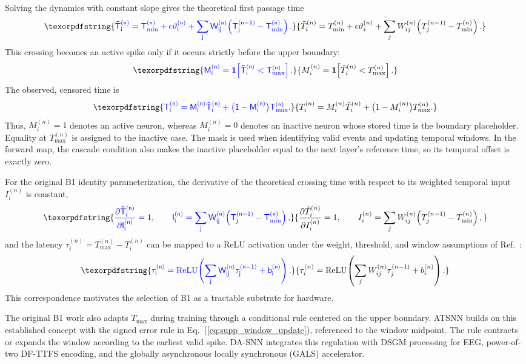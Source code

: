 \documentclass[12pt]{article}
\providecommand{\DIFaddtex}[1]{{\protect\color{blue}\sf #1}}
\providecommand{\DIFadd}[1]{\texorpdfstring{\DIFaddtex{#1}}{#1}}
\providecommand{\DIFaddend}{}
\begin{document}
\DIFadd{Solving the dynamics with constant slope gives the theoretical first passage time
}\begin{equation}
\DIFadd{\tilde{T}_i^{(n)} = T_{\min}^{(n)} + \epsilon\vartheta_i^{(n)} + \sum_j W_{ij}^{(n)}\!\left(T_j^{(n-1)} - T_{\min}^{(n)}\right).
\label{eq:supp_theoretical_time}
}\end{equation}
\DIFadd{This crossing becomes an active spike only if it occurs strictly before the upper boundary:
}\begin{equation}
\DIFadd{M_i^{(n)} = \mathbf{1}\!\left[\tilde{T}_i^{(n)} < T_{\max}^{(n)}\right].
\label{eq:b1_mask}
}\end{equation}
\DIFadd{The observed, censored time is
}\begin{equation}
\DIFadd{T_i^{(n)} = M_i^{(n)}\tilde{T}_i^{(n)} + \bigl(1-M_i^{(n)}\bigr)T_{\max}^{(n)}.
\label{eq:supp_actual_time}
}\end{equation}
\DIFadd{Thus, $M_i^{(n)}=1$ denotes an active neuron, whereas $M_i^{(n)}=0$ denotes an inactive neuron whose stored time is the boundary placeholder. Equality at $T_{\max}^{(n)}$ is assigned to the inactive case. The mask is used when identifying valid events and updating temporal windows. In the forward map, the cascade condition also makes the inactive placeholder equal to the next layer's reference time, so its temporal offset is exactly zero.
}

\DIFadd{For the original B1 identity parameterization, the derivative of the theoretical crossing time with respect to its weighted temporal input $I_i^{(n)}$ is constant,
}\begin{equation}
\DIFadd{\frac{\partial \tilde{T}_i^{(n)}}{\partial I_i^{(n)}}=1,
\qquad
I_i^{(n)}=\sum_j W_{ij}^{(n)}\!\left(T_j^{(n-1)}-T_{\min}^{(n)}\right),
\label{eq:b1_slope}
}\end{equation}
\DIFadd{and the latency $\tau_i^{(n)}=T_{\max}^{(n)}-T_i^{(n)}$ can be mapped to a ReLU activation under the weight, threshold, and window assumptions of Ref.~\cite{ref46}:
}\begin{equation}
\DIFadd{\tau_i^{(n)}=\mathrm{ReLU}\!\left(\sum_j W_{ij}^{(n)}\tau_j^{(n-1)}+b_i^{(n)}\right).
\label{eq:b1_relu}
}\end{equation}
\DIFadd{This correspondence motivates the selection of B1 as a tractable substrate for hardware.
}

\DIFadd{The original B1 work also adapts $T_{\max}$ during training through a conditional rule centered on the upper boundary. ATSNN builds on this established concept with the signed error rule in Eq.~(\ref{eq:supp_window_update}), referenced to the window midpoint. The rule contracts or expands the window according to the earliest valid spike. DA-SNN integrates this regulation with DSGM processing for EEG, power-of-two DF-TTFS encoding, and the globally asynchronous locally synchronous (GALS) accelerator}\DIFaddend .
\end{document}

